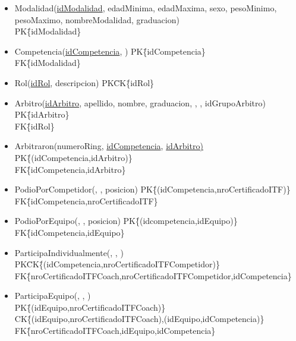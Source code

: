 \begin{itemize}
\item{Modalidad(\underline{idModalidad}, edadMinima, edadMaxima, sexo, pesoMinimo, pesoMaximo, nombreModalidad, graduacion) \\
PK\=\{idModalidad\}
}

\item{Competencia(\underline{idCompetencia}, )
PK\=\{idCompetencia\}\\
FK\=\{idModalidad\}
}

\item{Rol(\underline{idRol}, descripcion)
PK\=CK\=\{idRol\}
}

\item{Arbitro(\underline{idArbitro}, apellido, nombre, graduacion, , , idGrupoArbitro)\\
PK\=\{idArbitro\}\\
FK\=\{idRol\}
}

\item{Arbitraron(numeroRing, \underline{idCompetencia}, \underline{idArbitro)}
PK\= \{(idCompetencia,idArbitro)\}\\
FK\=\{idCompetencia,idArbitro\}
}

\item{PodioPorCompetidor(\underline{}, \underline{}, posicion)
PK\= \{(idCompetencia,nroCertificadoITF)\}\\
FK\=\{idCompetencia,nroCertificadoITF\}
}

\item{PodioPorEquipo(\underline{}, \underline{}, posicion)
PK\= \{(idcompetencia,idEquipo)\}\\
FK\=\{idCompetencia,idEquipo\}
}

\item{ParticipaIndividualmente(\underline{}, \underline{}, )\\
PK\=CK\= \{(idCompetencia,nroCertificadoITFCompetidor)\}\\
FK\=\{nroCertificadoITFCoach,nroCertificadoITFCompetidor,idCompetencia\}
}

\item{ParticipaEquipo(, , \underline{})\\
PK\= \{(idEquipo,nroCertificadoITFCoach)\}\\
CK\= \{(idEquipo,nroCertificadoITFCoach),(idEquipo,idCompetencia)\}\\
FK\=\{nroCertificadoITFCoach,idEquipo,idCompetencia\}
}

\end{itemize}

